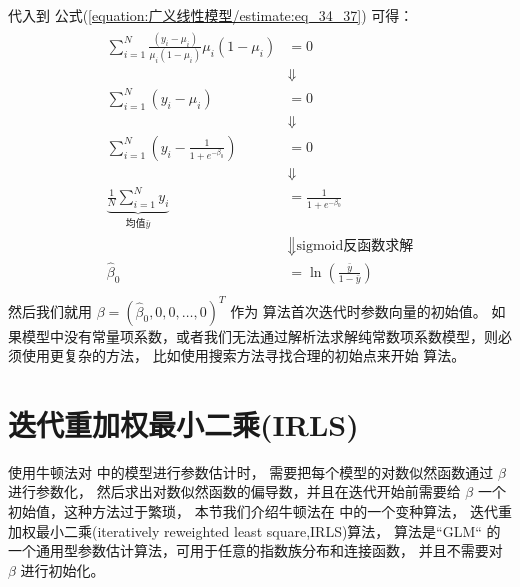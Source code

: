 \documentclass[letterpaper,10pt,english]{sphinxmanual}
\begin{document}
代入到 公式(\ref{equation:广义线性模型/estimate:eq_34_37}) 可得：
\begin{align}\label{equation:广义线性模型/estimate:广义线性模型/estimate:33}\!\begin{aligned}
\sum_{i=1}^N \frac{(y_i- \mu_i ) }{\mu_i(1-\mu_i)} \mu_i(1-\mu_i) &= 0\\
&\Downarrow\\
\sum_{i=1}^N (y_i- \mu_i) &=0\\
&\Downarrow\\
\sum_{i=1}^N (y_i- \frac{1}{1+e^{-\beta_0}}) &=0\\
&\Downarrow\\
\underbrace{\frac{1}{N}\sum_{i=1}^N y_i}_{\text{均值}\bar{y}} &=  \frac{1}{1+e^{-\beta_0}}\\
&\Downarrow{\text{sigmoid反函数求解}}\\
\hat{\beta}_0 &= \ln \left (  \frac{\bar{y}}{1-\bar{y}}   \right )\\
\end{aligned}\end{align}
然后我们就用 \(\beta=(\hat{\beta}_0,0,0,\dots,0)^T\) 作为
 算法首次迭代时参数向量的初始值。
如果模型中没有常量项系数，或者我们无法通过解析法求解纯常数项系数模型，则必须使用更复杂的方法，
比如使用搜索方法寻找合理的初始点来开始  算法。


\section{迭代重加权最小二乘(IRLS)}
\label{\detokenize{_u5e7f_u4e49_u7ebf_u6027_u6a21_u578b/estimate:irls}}
使用牛顿法对  中的模型进行参数估计时，
需要把每个模型的对数似然函数通过 \(\beta\) 进行参数化，
然后求出对数似然函数的偏导数，并且在迭代开始前需要给
\(\beta\) 一个初始值，这种方法过于繁琐，
本节我们介绍牛顿法在  中的一个变种算法，
迭代重加权最小二乘(iteratively reweighted least square,IRLS)算法，
 算法是``GLM`` 的一个通用型参数估计算法，可用于任意的指数族分布和连接函数，
并且不需要对 \(\beta\) 进行初始化。
\end{document}
